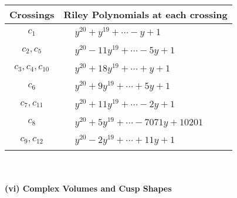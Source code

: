 \documentclass[1p]{elsarticle_modified}
\theoremstyle{definition}
\begin{document}
\begin{tabular}{m{50pt}|m{274pt}}
Crossings & \hspace{64pt}Riley Polynomials at each crossing \\
\hline $$\begin{aligned}c_{1}\end{aligned}$$&$\begin{aligned}
&y^{20}+y^{19}+\cdots- y+1
\end{aligned}$\\
\hline $$\begin{aligned}c_{2},c_{5}\end{aligned}$$&$\begin{aligned}
&y^{20}-11 y^{19}+\cdots-5 y+1
\end{aligned}$\\
\hline $$\begin{aligned}c_{3},c_{4},c_{10}\end{aligned}$$&$\begin{aligned}
&y^{20}+18 y^{19}+\cdots+y+1
\end{aligned}$\\
\hline $$\begin{aligned}c_{6}\end{aligned}$$&$\begin{aligned}
&y^{20}+9 y^{19}+\cdots+5 y+1
\end{aligned}$\\
\hline $$\begin{aligned}c_{7},c_{11}\end{aligned}$$&$\begin{aligned}
&y^{20}+11 y^{19}+\cdots-2 y+1
\end{aligned}$\\
\hline $$\begin{aligned}c_{8}\end{aligned}$$&$\begin{aligned}
&y^{20}+5 y^{19}+\cdots-7071 y+10201
\end{aligned}$\\
\hline $$\begin{aligned}c_{9},c_{12}\end{aligned}$$&$\begin{aligned}
&y^{20}-2 y^{19}+\cdots+11 y+1
\end{aligned}$\\
\hline
\end{tabular}\\~\\
\newpage\flushleft \textbf{(vi) Complex Volumes and Cusp Shapes}
\end{document}
